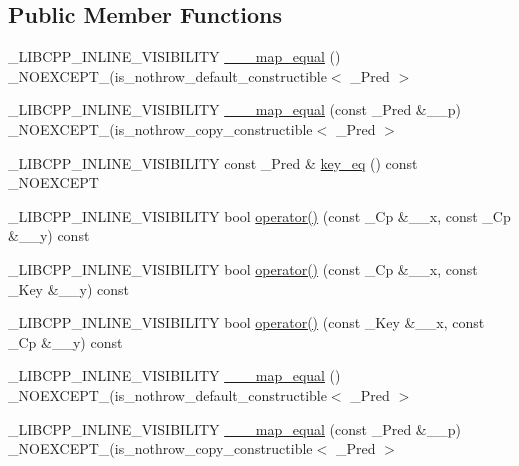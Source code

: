 \subsection*{Public Member Functions}
\begin{DoxyCompactItemize}
\item 
\+\_\+\+L\+I\+B\+C\+P\+P\+\_\+\+I\+N\+L\+I\+N\+E\+\_\+\+V\+I\+S\+I\+B\+I\+L\+I\+T\+Y \hyperlink{class______map__equal_a95533cc0358047580fa982c3b2713bcc}{\+\_\+\+\_\+\+\_\+map\+\_\+equal} () \+\_\+\+N\+O\+E\+X\+C\+E\+P\+T\+\_\+(is\+\_\+nothrow\+\_\+default\+\_\+constructible$<$ \+\_\+\+Pred $>$
\item 
\+\_\+\+L\+I\+B\+C\+P\+P\+\_\+\+I\+N\+L\+I\+N\+E\+\_\+\+V\+I\+S\+I\+B\+I\+L\+I\+T\+Y \hyperlink{class______map__equal_ae2e9e62e4beb119f42aa20e2d2dc0f04}{\+\_\+\+\_\+\+\_\+map\+\_\+equal} (const \+\_\+\+Pred \&\+\_\+\+\_\+p) \+\_\+\+N\+O\+E\+X\+C\+E\+P\+T\+\_\+(is\+\_\+nothrow\+\_\+copy\+\_\+constructible$<$ \+\_\+\+Pred $>$
\item 
\+\_\+\+L\+I\+B\+C\+P\+P\+\_\+\+I\+N\+L\+I\+N\+E\+\_\+\+V\+I\+S\+I\+B\+I\+L\+I\+T\+Y const \+\_\+\+Pred \& \hyperlink{class______map__equal_add4420efffdc70c6b42be2aaaacbae2a}{key\+\_\+eq} () const \+\_\+\+N\+O\+E\+X\+C\+E\+P\+T
\item 
\+\_\+\+L\+I\+B\+C\+P\+P\+\_\+\+I\+N\+L\+I\+N\+E\+\_\+\+V\+I\+S\+I\+B\+I\+L\+I\+T\+Y bool \hyperlink{class______map__equal_a085532e0ec93fb5727e13db7881b1afd}{operator()} (const \+\_\+\+Cp \&\+\_\+\+\_\+x, const \+\_\+\+Cp \&\+\_\+\+\_\+y) const 
\item 
\+\_\+\+L\+I\+B\+C\+P\+P\+\_\+\+I\+N\+L\+I\+N\+E\+\_\+\+V\+I\+S\+I\+B\+I\+L\+I\+T\+Y bool \hyperlink{class______map__equal_a1bd9111ef0e0c36338fad7e015a635bb}{operator()} (const \+\_\+\+Cp \&\+\_\+\+\_\+x, const \+\_\+\+Key \&\+\_\+\+\_\+y) const 
\item 
\+\_\+\+L\+I\+B\+C\+P\+P\+\_\+\+I\+N\+L\+I\+N\+E\+\_\+\+V\+I\+S\+I\+B\+I\+L\+I\+T\+Y bool \hyperlink{class______map__equal_a8292b0d2bbe834c1f7de58b4e146f126}{operator()} (const \+\_\+\+Key \&\+\_\+\+\_\+x, const \+\_\+\+Cp \&\+\_\+\+\_\+y) const 
\item 
\+\_\+\+L\+I\+B\+C\+P\+P\+\_\+\+I\+N\+L\+I\+N\+E\+\_\+\+V\+I\+S\+I\+B\+I\+L\+I\+T\+Y \hyperlink{class______map__equal_a95533cc0358047580fa982c3b2713bcc}{\+\_\+\+\_\+\+\_\+map\+\_\+equal} () \+\_\+\+N\+O\+E\+X\+C\+E\+P\+T\+\_\+(is\+\_\+nothrow\+\_\+default\+\_\+constructible$<$ \+\_\+\+Pred $>$
\item 
\+\_\+\+L\+I\+B\+C\+P\+P\+\_\+\+I\+N\+L\+I\+N\+E\+\_\+\+V\+I\+S\+I\+B\+I\+L\+I\+T\+Y \hyperlink{class______map__equal_ae2e9e62e4beb119f42aa20e2d2dc0f04}{\+\_\+\+\_\+\+\_\+map\+\_\+equal} (const \+\_\+\+Pred \&\+\_\+\+\_\+p) \+\_\+\+N\+O\+E\+X\+C\+E\+P\+T\+\_\+(is\+\_\+nothrow\+\_\+copy\+\_\+constructible$<$ \+\_\+\+Pred $>$

\end{DoxyCompactItemize}
